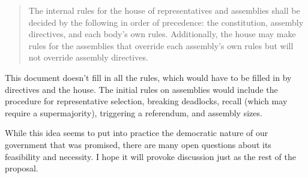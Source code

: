 \documentclass{article}
\begin{document}
\begin{quote}
The internal rules for the house of representatives and assemblies shall be decided by the following in order of precedence: the constitution, assembly directives, and each body’s own rules. Additionally, the house may make rules for the assemblies that override each assembly’s own rules but will not override assembly directives.
\end{quote}

This document doesn’t fill in all the rules, which would have to be filled in by directives and the house. The initial rules on assemblies would include the procedure for representative selection, breaking deadlocks, recall (which may require a supermajority), triggering a referendum, and assembly sizes.

While this idea seems to put into practice the democratic nature of our government that was promised, there are many open questions about its feasibility and necessity. I hope it will provoke discussion just as the rest of the proposal.
\end{document}

